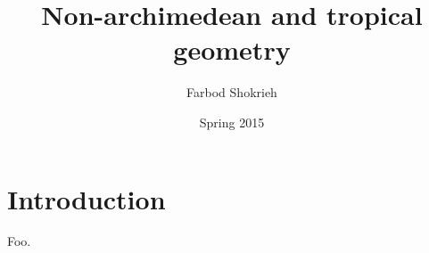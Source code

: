 \documentclass[oneside]{article}
\title{Non-archimedean and tropical geometry}
\author{Farbod Shokrieh}
\date{Spring 2015}
\begin{document}
\maketitle
\tableofcontents





\section{Introduction}

Foo.
\end{document}
